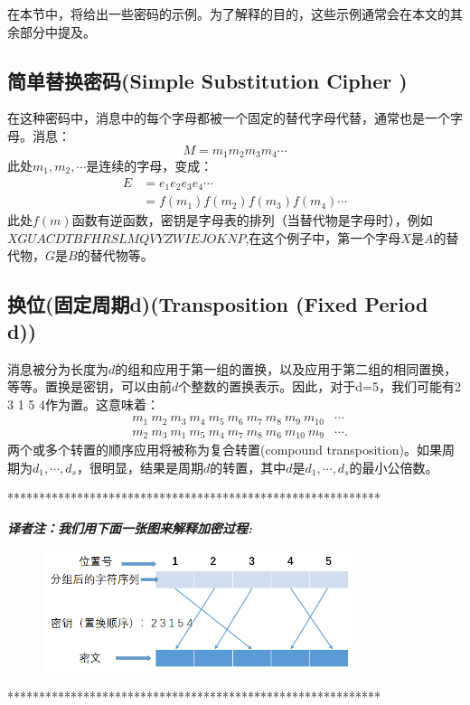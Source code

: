 \documentclass[]{article}
\begin{document}
在本节中，将给出一些密码的示例。为了解释的目的，这些示例通常会在本文的其余部分中提及。

\subsection{简单替换密码(Simple Substitution Cipher )}
在这种密码中，消息中的每个字母都被一个固定的替代字母代替，通常也是一个字母。消息：
\[M=m_1 m_2 m_3 m_4\cdots\]
此处$m_1,m_2,\cdots$是连续的字母，变成：
\begin{equation}
\begin{aligned}
	E &=e_1 e_2 e_3 e_4 \cdots \\
	&= f(m_1)f(m_2)f(m_3)f(m_4)\cdots\nonumber
\end{aligned}
\end{equation}
此处$f(m)$函数有逆函数，密钥是字母表的排列（当替代物是字母时），例如$X G U A C D T B F H R S L M Q V Y Z W I E J O K N P$,在这个例子中，第一个字母$X$是$A$的替代物，$G$是$B$的替代物等。


\subsection{换位(固定周期d)(Transposition (Fixed Period d))}
消息被分为长度为$d$的组和应用于第一组的置换，以及应用于第二组的相同置换，等等。置换是密钥，可以由前$d$个整数的置换表示。因此，对于d=5，我们可能有2 3 1 5 4作为置。这意味着：
\begin{equation}
	\begin{aligned}
		&m_1\ m_2\ m_3\ m_4\ m_5 \ m_6\ m_7 \ m_8 \ m_9 \ m_{10} &\cdots \\
		&m_2\ m_3\ m_1\ m_5\ m_4 \ m_7\ m_8 \ m_6 \ m_{10} \ m_9 &\cdots.\nonumber
	\end{aligned}
\end{equation}
两个或多个转置的顺序应用将被称为复合转置(compound transposition)。如果周期为$d_1,\cdots,d_s$，很明显，结果是周期$d$的转置，其中$d$是$d_1,\cdots,d_s$的最小公倍数。

\vspace{1cm}
***********************************************************\par
\textsl{\textbf{译者注：我们用下面一张图来解释加密过程:}}\par
	\begin{figure}[htbp]
		\includegraphics[width=0.8\textwidth]{transpostion-fixedp.png}
	\end{figure}
\par
***********************************************************\par
\vspace{1cm}
\end{document}
